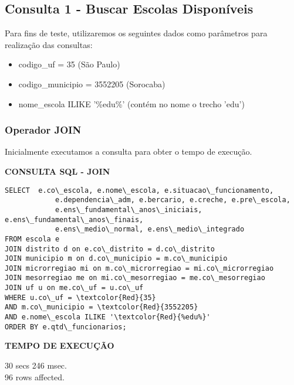 \documentclass[12pt,a4paper]{article}
\begin{document}
\subsection{Consulta 1 - Buscar Escolas Disponíveis}

Para fins de teste, utilizaremos os seguintes dados como parâmetros para realização das consultas: 
\begin{itemize}
    \item codigo\_uf = 35 (São Paulo)
    \item codigo\_municipio = 3552205 (Sorocaba)
    \item nome\_escola ILIKE '\%edu\%' (contém no nome o trecho 'edu')
\end{itemize}

\subsubsection{Operador JOIN}

Inicialmente executamos a consulta para obter o tempo de execução.

\vspace{0.5cm}

\begin{flushleft}
\textbf{CONSULTA SQL - JOIN}\\
\end{flushleft}

\begin{Verbatim}[commandchars=\\\{\}]
SELECT  e.co\_escola, e.nome\_escola, e.situacao\_funcionamento,
            e.dependencia\_adm, e.bercario, e.creche, e.pre\_escola,
            e.ens\_fundamental\_anos\_iniciais, e.ens\_fundamental\_anos\_finais,
            e.ens\_medio\_normal, e.ens\_medio\_integrado
FROM escola e
JOIN distrito d on e.co\_distrito = d.co\_distrito
JOIN municipio m on d.co\_municipio = m.co\_municipio
JOIN microrregiao mi on m.co\_microrregiao = mi.co\_microrregiao
JOIN mesorregiao me on mi.co\_mesorregiao = me.co\_mesorregiao
JOIN uf u on me.co\_uf = u.co\_uf
WHERE u.co\_uf = \textcolor{Red}{35}
AND m.co\_municipio = \textcolor{Red}{3552205}
AND e.nome\_escola ILIKE '\textcolor{Red}{%edu%}'
ORDER BY e.qtd\_funcionarios;
\end{Verbatim}

\begin{flushleft}
\textbf{TEMPO DE EXECUÇÃO}\\
\end{flushleft}
30 secs 246 msec.\\
96 rows affected.\\
\end{document}
